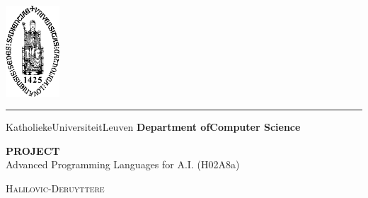 \documentclass{report}
\begin{document}
\lstset{language=Prolog}          %

\begin{titlepage}
	\newpage
	\thispagestyle{empty}
	\frenchspacing
	\hspace{-0.2cm}
	\includegraphics[height=3.4cm]{sedes}
	\hspace{0.2cm}
	\rule{0.5pt}{3.4cm}
	\hspace{0.2cm}
	\begin{minipage}[b]{8cm}
		\Large{Katholieke\newline Universiteit\newline Leuven}\smallskip\newline
		\large{}\smallskip\newline
		\textbf{Department of\newline Computer Science}\smallskip
	\end{minipage}
	\vspace*{3.2cm}\vfill
	\begin{center}
		\begin{minipage}[t]{\textwidth}
			\begin{center}
				\LARGE{\rm{\textbf{\uppercase{Project}}}}\\
				\Large{\rm{Advanced Programming Languages for A.I. (H02A8a) }}\\
				\vspace{0.5cm}
			   
			    \large{\textsc{Halilovic-Deruyttere}}%
				
			\end{center}
		\end{minipage}
	\end{center}
	\vfill
	\hfill{}
\end{titlepage}
\end{document}
